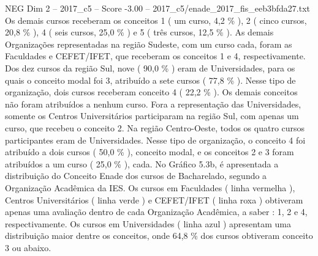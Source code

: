 \begin{textsample}{NEG Dim 2 – 2017\_c5 – Score -3.00 – 2017\_c5/enade\_2017\_fis\_eeb3bfda27.txt}
Os demais cursos receberam os conceitos 1 ( um curso, 4,2 \% ), 2 ( cinco cursos, 20,8 \% ), 4 ( seis cursos, 25,0 \% ) e 5 ( três cursos, 12,5 \% ).
As demais Organizações representadas na região Sudeste, com um curso cada, foram as Faculdades e CEFET/IFET, que receberam os conceitos 1 e 4, respectivamente.
Dos dez cursos da região Sul, nove ( 90,0 \% ) eram de Universidades, para os quais o conceito modal foi 3, atribuído a sete cursos ( 77,8 \% ).
Nesse tipo de organização, dois cursos receberam conceito 4 ( 22,2 \% ).
Os demais conceitos não foram atribuídos a nenhum curso.
Fora a representação das Universidades, somente os Centros Universitários participaram na região Sul, com apenas um curso, que recebeu o conceito 2.
Na região Centro-Oeste, todos os quatro cursos participantes eram de Universidades.
Nesse tipo de organização, o conceito 4 foi atribuído a dois cursos ( 50,0 \% ), conceito modal, e os conceitos 2 e 3 foram atribuídos a um curso ( 25,0 \% ), cada.
No Gráfico 5.3b, é apresentada a distribuição do Conceito Enade dos cursos de Bacharelado, segundo a Organização Acadêmica da IES.
Os cursos em Faculdades ( linha vermelha ), Centros Universitários ( linha verde ) e CEFET/IFET ( linha roxa ) obtiveram apenas uma avaliação dentro de cada Organização Acadêmica, a saber : 1, 2 e 4, respectivamente.
Os cursos em Universidades ( linha azul ) apresentam uma distribuição maior dentre os conceitos, onde 64,8 \% dos cursos obtiveram conceito 3 ou abaixo.

\end{textsample}
